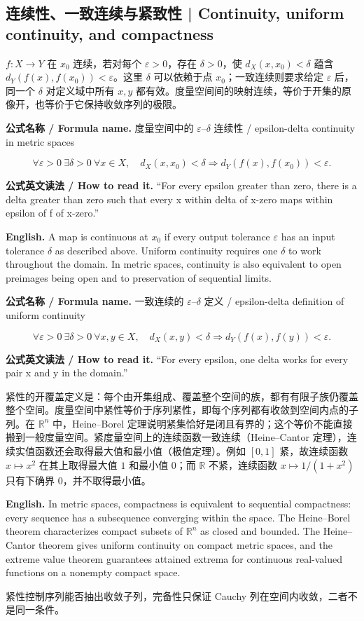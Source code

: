 \documentclass[UTF8,11pt,a4paper]{ctexart}
\newcommand{\EN}[1]{\par\noindent\textbf{English.} #1\par}
\newcommand{\READ}[1]{\par\noindent\textbf{公式英文读法 / How to read it.} #1\par}
\let\APSsubsection\subsection
\renewcommand{\subsection}[1]{\Needspace{6\baselineskip}\APSsubsection{#1}}
\newcommand{\FORMULA}[2]{\par\Needspace{3\baselineskip}\noindent\textbf{公式名称 / Formula name.} #1 / #2\par}
\begin{document}
\subsection{连续性、一致连续与紧致性 | Continuity, uniform continuity, and compactness}
\noindent $f:X\to Y$ 在 $x_0$ 连续，若对每个 $\varepsilon>0$，存在 $\delta>0$，使 $d_X(x,x_0)<\delta$ 蕴含 $d_Y(f(x),f(x_0))<\varepsilon$。这里 $\delta$ 可以依赖于点 $x_0$；一致连续则要求给定 $\varepsilon$ 后，同一个 $\delta$ 对定义域中所有 $x,y$ 都有效。度量空间间的映射连续，等价于开集的原像开，也等价于它保持收敛序列的极限。
\FORMULA{度量空间中的 $\varepsilon$--$\delta$ 连续性}{epsilon-delta continuity in metric spaces}
\[
\forall\varepsilon>0\ \exists\delta>0\ \forall x\in X,
\quad d_X(x,x_0)<\delta\Longrightarrow
d_Y(f(x),f(x_0))<\varepsilon.
\]
\READ{“For every epsilon greater than zero, there is a delta greater than zero such that every x within delta of x-zero maps within epsilon of f of x-zero.”}
\EN{A map is continuous at $x_0$ if every output tolerance $\varepsilon$ has an input tolerance $\delta$ as described above. Uniform continuity requires one $\delta$ to work throughout the domain. In metric spaces, continuity is also equivalent to open preimages being open and to preservation of sequential limits.}
\FORMULA{一致连续的 $\varepsilon$--$\delta$ 定义}{epsilon-delta definition of uniform continuity}
\[
\forall\varepsilon>0\ \exists\delta>0\ \forall x,y\in X,
\quad d_X(x,y)<\delta\Longrightarrow d_Y(f(x),f(y))<\varepsilon.
\]
\READ{“For every epsilon, one delta works for every pair x and y in the domain.”}
\noindent 紧性的开覆盖定义是：每个由开集组成、覆盖整个空间的族，都有有限子族仍覆盖整个空间。度量空间中紧性等价于序列紧性，即每个序列都有收敛到空间内点的子列。在 $\mathbb R^n$ 中，Heine--Borel 定理说明紧集恰好是闭且有界的；这个等价不能直接搬到一般度量空间。紧度量空间上的连续函数一致连续（Heine--Cantor 定理），连续实值函数还会取得最大值和最小值（极值定理）。例如 $[0,1]$ 紧，故连续函数 $x\mapsto x^2$ 在其上取得最大值 $1$ 和最小值 $0$；而 $\mathbb R$ 不紧，连续函数 $x\mapsto 1/(1+x^2)$ 只有下确界 $0$，并不取得最小值。
\EN{In metric spaces, compactness is equivalent to sequential compactness: every sequence has a subsequence converging within the space. The Heine--Borel theorem characterizes compact subsets of $\mathbb R^n$ as closed and bounded. The Heine--Cantor theorem gives uniform continuity on compact metric spaces, and the extreme value theorem guarantees attained extrema for continuous real-valued functions on a nonempty compact space.}
\noindent 紧性控制序列能否抽出收敛子列，完备性只保证 Cauchy 列在空间内收敛，二者不是同一条件。
\end{document}
